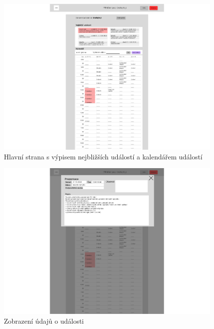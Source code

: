 \begin{figure}[htbp]
    \centering
    \includegraphics[width = \textwidth, trim=200 300 200 0, clip]{doc/latex/fig/ondra/figma1.pdf}
    \caption{Hlavní strana s výpisem nejbližších událostí a kalendářem událostí}
    \label{fig:Ondra_figma_mainpage}
\end{figure}

\begin{figure}[htbp]
    \centering
    \includegraphics[width = \textwidth, trim=200 380 200 0, clip]{doc/latex/fig/ondra/figma2.pdf}
    \caption{Zobrazení údajů o události}
    \label{fig:Ondra_figma_event_detail}
\end{figure}

